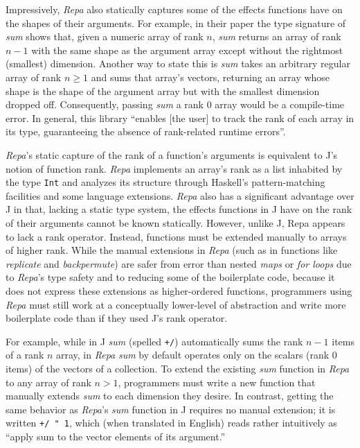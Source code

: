 Impressively, \textit{Repa} also statically captures some of the effects functions have on the shapes of their arguments.
For example, in their paper the type signature of \textit{sum} shows that, given a numeric array of rank $n$, 
\textit{sum} returns an array of rank $n-1$ with the same shape as the argument array 
except without the rightmost (smallest) dimension\cite{dph}.
Another way to state this is \textit{sum} takes an arbitrary regular array of rank $n \ge 1$ 
and sums that array's vectors, 
returning an array whose shape is the shape of the argument array but with the smallest dimension dropped off.
Consequently, passing \textit{sum} a rank 0 array would be a compile-time error.
In general, this library ``enables [the user] to track the rank of each array in its type,
guaranteeing the absence of rank-related runtime errors''\cite{dph}.

\textit{Repa}'s static capture of the rank of a function's arguments is equivalent to J's notion of function rank.
\textit{Repa} implements an array's rank as a list inhabited by the type \texttt{Int} %
and analyzes its structure through Haskell's pattern-matching facilities and some language extensions.
\textit{Repa} also has a significant advantage over J in that, lacking a static type system, 
the effects functions in J have on the rank of their arguments cannot be known statically.
However, unlike J, Repa appears to lack a rank operator.
Instead, functions must be extended manually to arrays of higher rank. 
While the manual extensions in \textit{Repa} 
(such as in functions like \textit{replicate} and \textit{backpermute}) 
are safer from error than nested \textit{maps} or \textit{for loops}
due to \textit{Repa}'s type safety and to reducing some of the boilerplate code,  
because it does not express these extensions as higher-ordered functions, 
programmers using \textit{Repa} must still work at a conceptually lower-level of abstraction 
and write more boilerplate code than if they used J's rank operator.

For example, while in J \textit{sum} (spelled \texttt{+/}) 
automatically sums the rank $n-1$ items of a rank $n$ array, 
in \textit{Repa} \textit{sum} by default operates only on the scalars (rank 0 items) of the vectors of a collection. 
To extend the existing \textit{sum} function in \textit{Repa} to any array of rank $n > 1$, 
programmers must write a new function that manually extends \textit{sum} to each dimension they desire\cite{dph}.
In contrast, getting the same behavior as \textit{Repa}'s \textit{sum} function in J requires no manual extension;
it is written \texttt{+/ " 1}, which (when translated in English) 
reads rather intuitively as ``apply sum to the vector elements of its argument.''

